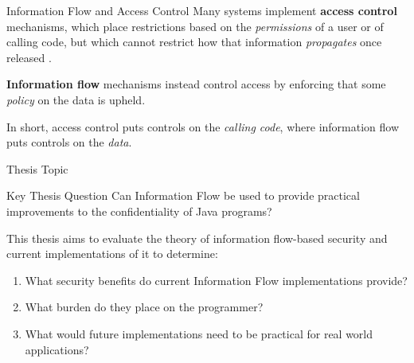 \begin{frame}{Information Flow and Access Control}
	Many systems implement \textbf{access control} mechanisms, which place restrictions based on the \textit{permissions} of a user or of calling code, but which cannot restrict how that information \textit{propagates} once released \cite{ifbackground:sabelfeld}.
	
	\textbf{Information flow} mechanisms instead control access by enforcing that some \textit{policy} on the data is upheld.
	
	In short, access control puts controls on the \textit{calling code}, where information flow puts controls on the \textit{data}.
\end{frame}

%			
%			



\begin{frame}{Thesis Topic}
	\begin{block}{Key Thesis Question}
		Can Information Flow be used to provide practical improvements to the confidentiality of Java programs?
	\end{block}
	
	This thesis aims to evaluate the theory of information flow-based security and current implementations of it to determine:
	
	\begin{enumerate}
		\item What security benefits do current Information Flow implementations provide?
		\item What burden do they place on the programmer?
		\item What would future implementations need to be practical for real world applications? 
	\end{enumerate}
\end{frame}